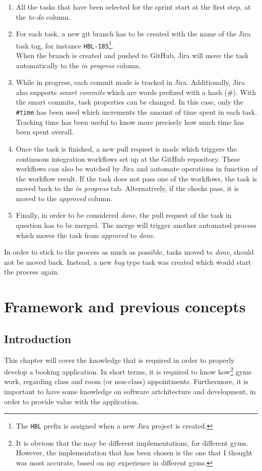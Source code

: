 \documentclass[a4paper, 12pt, oneside]{book}
\begin{document}
\begin{enumerate}
	\item All the tasks that have been selected for the sprint start at the first step, at the \emph{to-do} column.
	\item For each task, a new git branch has to be created with the name of the Jira task tag, for instance \texttt{HBL-185}\footnote{The \texttt{HBL} prefix is assigned when a new Jira project is created.}.
	      \\
	      When the branch is created and pushed to GitHub, Jira will move the task automatically to the \emph{in progress} column. \cite{jira-smart-commits}
	\item While in progress, each commit made is tracked in Jira. Additionally, Jira also supports \emph{smart commits} which are words prefixed with a hash (\#). With the smart commits, task properties can be changed. In this case, only the \texttt{\#time} has been used which increments the amount of time spent in each task. Tracking time has been useful to know more precisely how much time has been spent overall.
	\item Once the task is finished, a new pull request is made which triggers the continuous integration workflows set up at the GitHub repository. These workflows can also be watched by Jira and automate operations in function of the workflow result. If the task does not pass one of the workflows, the task is moved back to the \emph{in progress} tab. Alternatively, if the checks pass, it is moved to the \emph{approved} column.
	\item Finally, in order to be considered \emph{done}, the pull request of the task in question has to be merged. The merge will trigger another automated process which moves the task from \emph{approved} to \emph{done}.
\end{enumerate}
In order to stick to the process as much as possible, tasks moved to \emph{done}, should not be moved back. Instead, a new \emph{bug} type task was created which would start the process again.
\chapter{Framework and previous concepts}
\section{Introduction}
This chapter will cover the knowledge that is required in order to properly develop a booking application. In short terms, it is required to know how\footnote{It is obvious that the may be different implementations, for different gyms. However, the implementation that has been chosen is the one that I thought was most accurate, based on my experience in different gyms.} gyms work, regarding class and room (or non-class) appointments. Furthermore, it is important to have some knowledge on software artchitecture and development, in order to provide value with the application.
\end{document}
